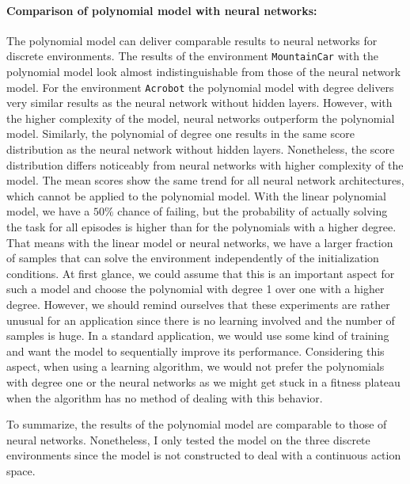 \paragraph*{Comparison of polynomial model with neural networks:} The polynomial model can deliver comparable results to neural networks for discrete environments. The results of the environment \texttt{MountainCar} with the polynomial model look almost indistinguishable from those of the neural network model. For the environment \texttt{Acrobot} the polynomial model with degree delivers very similar results as the neural network without hidden layers. However, with the higher complexity of the model, neural networks outperform the polynomial model. Similarly, the polynomial of degree one results in the same score distribution as the neural network without hidden layers. Nonetheless, the score distribution differs noticeably from neural networks with higher complexity of the model. The mean scores show the same trend for all neural network architectures, which cannot be applied to the polynomial model. With the linear polynomial model, we have a $50 \%$ chance of failing, but the probability of actually solving the task for all episodes is higher than for the polynomials with a higher degree. That means with the linear model or neural networks, we have a larger fraction of samples that can solve the environment independently of the initialization conditions. At first glance, we could assume that this is an important aspect for such a model and choose the polynomial with degree 1 over one with a higher degree. However, we should remind ourselves that these experiments are rather unusual for an application since there is no learning involved and the number of samples is huge. In a standard application, we would use some kind of training and want the model to sequentially improve its performance. Considering this aspect, when using a learning algorithm, we would not prefer the polynomials with degree one or the neural networks as we might get stuck in a fitness plateau when the algorithm has no method of dealing with this behavior.

To summarize, the results of the polynomial model are comparable to those of neural networks. Nonetheless, I only tested the model on the three discrete environments since the model is not constructed to deal with a continuous action space.

